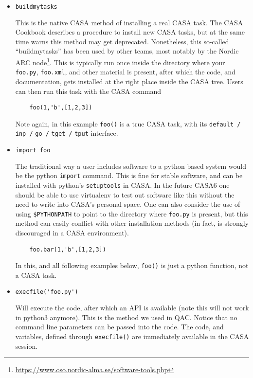\documentclass[11pt,twoside]{article}
\begin{document}
\begin{itemize}

\item[1.] \verb+buildmytasks+

This is the native CASA method of installing a real CASA task. The CASA Cookbook describes a
procedure to install new CASA tasks, but at the same time warns this
method may get deprecated. Nonetheless, this so-called
``buildmytasks'' has been used by other teams, most notably by the Nordic ARC
node\footnote{\url{https://www.oso.nordic-alma.se/software-tools.php}}. This
is typically run once inside the directory where your {\tt foo.py}, {\tt foo.xml},
and other material is present, after which the code, and documentation, gets installed
at the right place inside the CASA tree. Users can then run this task with the CASA command

\footnotesize
\begin{verbatim}
    foo(1,'b',[1,2,3])
\end{verbatim}
\normalsize

Note again, in this example \verb+foo()+
is a true CASA task, with its
\verb+default /+
\verb+inp /+
\verb+go /+
\verb+tget /+
\verb+tput+
interface.

\item[2.] \verb+import foo+

The traditional way a user includes software to a python based system
would be the python {\tt import} command.
This is fine for stable software, and can be installed with python's
{\tt setuptools} in CASA. In the future CASA6 one should be able to use
virtualenv to test out software like this without the need to write
into CASA's personal space. One can also consider the use of using \verb+$PYTHONPATH+
to point to the directory where {\tt foo.py} is present, but this method can
easily conflict with other installation methods (in fact, is strongly discouraged
in a CASA environment).


\footnotesize
\begin{verbatim}
    foo.bar(1,'b',[1,2,3])
\end{verbatim}
\normalsize

In this, and all following examples below, \verb+foo()+ is just a python function, not a CASA task.


\item[3.] \verb+execfile('foo.py')+

Will execute the code,  after which an API is available  (note this will not work in python3 anymore).
This is the method we used in QAC. Notice that no command line parameters can be passed into
the code. The code, and variables, defined through {\tt execfile()} are immediately available
in the CASA session.


\end{itemize}
\end{document}
